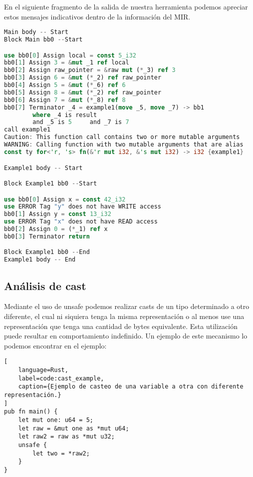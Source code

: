 En el siguiente fragmento de la salida de nuestra herramienta podemos apreciar estos mensajes indicativos dentro de la información del MIR.

\begin{lstlisting}[language=Rust]
Main body -- Start
Block Main bb0 --Start

use bb0[0] Assign local = const 5_i32
bb0[1] Assign 3 = &mut _1 ref local
bb0[2] Assign raw_pointer = &raw mut (*_3) ref 3
bb0[3] Assign 6 = &mut (*_2) ref raw_pointer
bb0[4] Assign 5 = &mut (*_6) ref 6
bb0[5] Assign 8 = &mut (*_2) ref raw_pointer
bb0[6] Assign 7 = &mut (*_8) ref 8
bb0[7] Terminator _4 = example1(move _5, move _7) -> bb1
        where _4 is result
        and _5 is 5     and _7 is 7
call example1
Caution: This function call contains two or more mutable arguments
WARNING: Calling function with two mutable arguments that are alias
const ty for<'r, 's> fn(&'r mut i32, &'s mut i32) -> i32 {example1}

Example1 body -- Start

Block Example1 bb0 --Start

use bb0[0] Assign x = const 42_i32
use ERROR Tag "y" does not have WRITE access
bb0[1] Assign y = const 13_i32
use ERROR Tag "x" does not have READ access
bb0[2] Assign 0 = (*_1) ref x
bb0[3] Terminator return

Block Example1 bb0 --End
Example1 body -- End
\end{lstlisting}

\subsection{Análisis de cast}
Mediante el uso de unsafe podemos realizar casts de un tipo determinado a otro diferente, el cual ni siquiera tenga la misma representación o al menos use una representación que tenga una cantidad de bytes equivalente. Esta utilización puede resultar en comportamiento indefinido. Un ejemplo de este mecanismo lo podemos encontrar en el ejemplo:

\begin{lstlisting}[
    language=Rust,
    label=code:cast_example,
    caption={Ejemplo de casteo de una variable a otra con diferente representación.}
]
pub fn main() {
    let mut one: u64 = 5;
    let raw = &mut one as *mut u64;
    let raw2 = raw as *mut u32;
    unsafe {
        let two = *raw2;
    }
}
\end{lstlisting}

